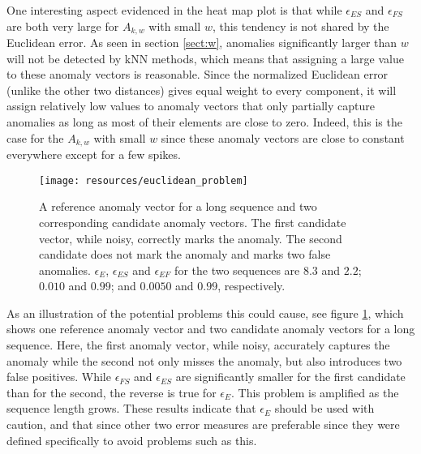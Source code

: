 One interesting aspect evidenced in the heat map plot is that while $\epsilon_{ES}$ and $\epsilon_{FS}$ are both very large for $A_{k,w}$ with small $w$, this tendency is not shared by the Euclidean error. As seen in section \ref{sect:w}, anomalies significantly larger than $w$ will not be detected by kNN methods, which means that assigning a large value to these anomaly vectors is reasonable. Since the normalized Euclidean error (unlike the other two distances) gives equal weight to every component, it will assign relatively low values to anomaly vectors that only partially capture anomalies as long as most of their elements are close to zero.  Indeed, this is the case for the $A_{k,w}$ with small $w$ since these anomaly vectors are close to constant everywhere except for a few spikes.

\begin{figure}[ht]
    \vspace{-5pt}
    \begin{center}
        \texttt{[image: resources/euclidean\_problem]}
    \end{center}
    \vspace{-20pt}
    \caption{\small{A reference anomaly vector for a long sequence and two corresponding candidate anomaly vectors. The first candidate vector, while noisy, correctly marks the anomaly. The second candidate does not mark the anomaly and marks two false anomalies. $\epsilon_{E}$, $\epsilon_{ES}$ and $\epsilon_{EF}$ for the two sequences are $8.3$ and $2.2$; $0.010$ and $0.99$; and $0.0050$ and $0.99$, respectively.}}
    \label{fig:euclidean_problem}
    \vspace{-10pt}
\end{figure}

As an illustration of the potential problems this could cause, see figure \ref{fig:euclidean_problem}, which shows one reference anomaly vector and two candidate anomaly vectors for a long sequence. Here, the first anomaly vector, while noisy, accurately captures the anomaly while the second not only misses the anomaly, but also introduces two false positives. While $\epsilon_{FS}$ and $\epsilon_{ES}$ are significantly smaller for the first candidate than for the second, the reverse is true for $\epsilon_E$. This problem is amplified as the sequence length grows. These results indicate that $\epsilon_E$ should be used with caution, and that since other two error measures are preferable since they were defined specifically to avoid problems such as this.

